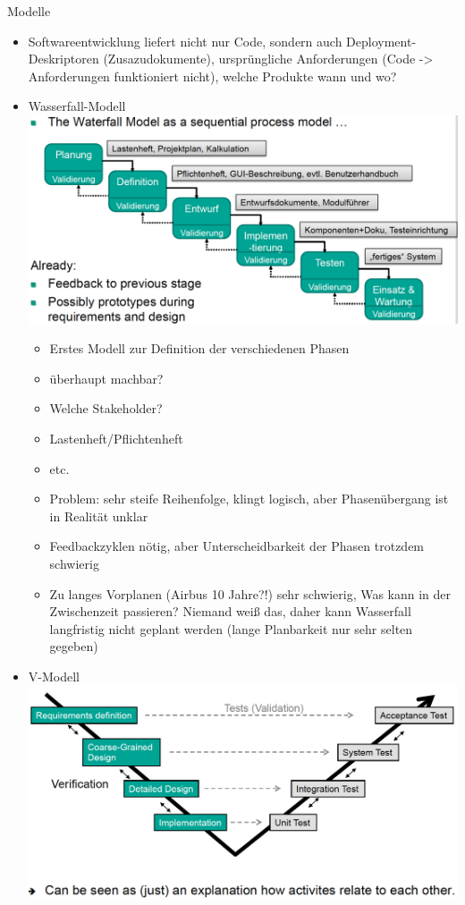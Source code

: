 \documentclass[paper=a4, fontsize=11pt]{scrartcl} %
\numberwithin{equation}{section} %
\numberwithin{figure}{section} %
\numberwithin{table}{section} %
\begin{document}
Modelle
\begin{itemize}
  \item Softwareentwicklung liefert nicht nur Code, sondern auch Deployment-Deskriptoren (Zusazudokumente), ursprüngliche Anforderungen (Code -> Anforderungen funktioniert nicht), welche Produkte wann und wo?
  \item Wasserfall-Modell\\
  \includegraphics[width=\linewidth]{imgs/wasserfall}
  \begin{itemize}
    \item Erstes Modell zur Definition der verschiedenen Phasen
    \item überhaupt machbar?
    \item Welche Stakeholder?
    \item Lastenheft/Pflichtenheft
    \item etc.
    \item Problem: sehr steife Reihenfolge, klingt logisch, aber Phasenübergang ist in Realität unklar
    \item Feedbackzyklen nötig, aber Unterscheidbarkeit der Phasen trotzdem schwierig
    \item Zu langes Vorplanen (Airbus 10 Jahre?!) sehr schwierig, Was kann in der Zwischenzeit passieren? Niemand weiß das, daher kann Wasserfall langfristig nicht geplant werden (lange Planbarkeit nur sehr selten gegeben)
  \end{itemize}
  \item V-Modell\\
  \includegraphics[width=\linewidth]{imgs/vmodell}

\end{itemize}
\end{document}
